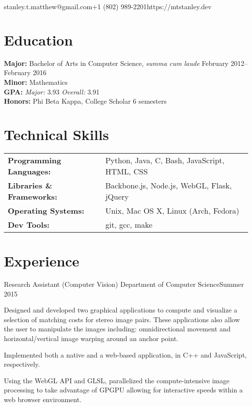 \documentclass[10pt]{resume}
\begin{document}

\vspace{0.5em}
{stanley.t.matthew@gmail.com}{+1 (802) 989-2201}{https://mtstanley.dev}

\section{Education}

\textbf{Major:} Bachelor of Arts in Computer Science, \textit{summa cum laude} \hfill February 2012--February 2016\\
\textbf{Minor:} Mathematics\\
\textbf{GPA:} \textit{Major:} 3.93 \textit{Overall:} 3.91\\
\textbf{Honors:} Phi Beta Kappa, College Scholar 6 semesters

\section{Technical Skills}
\begin{tabular}{>{\bfseries}l l}
Programming Languages:  &  Python, Java, C, Bash, JavaScript, HTML, CSS \\
Libraries \& Frameworks:&  Backbone.js, Node.js, WebGL, Flask, jQuery   \\
Operating Systems:      &  Unix, Mac OS X, Linux (Arch, Fedora)         \\
Dev Tools:              &  git, gcc, make                               \\
\end{tabular}

\section{Experience}

\expblock
{Research Assistant (Computer Vision) \textnormal{Department of Computer Science}}{Summer 2015} 
{
    \item Designed and developed two graphical applications to compute and
    visualize a selection of matching costs for stereo image pairs. These
    applications also allow the user to manipulate the images including:
    omnidirectional movement and horizontal/vertical image warping around
    an anchor point.

    \item Implemented both a native and a web-based application, in C++ and
    JavaScript, respectively.

    \item Using the WebGL API and GLSL, parallelized the compute-intensive
    image processing to take advantage of GPGPU allowing for interactive
    speeds within a web browser environment.
}
\end{document}
